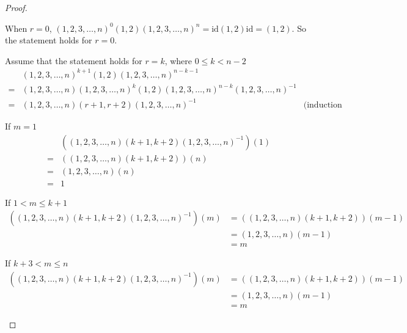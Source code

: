 \begin{proof}
\begin{enumerate}[label={\textbf{Case \arabic*.}},itemindent=1cm]
              When $r = 0$, ${(1,2,3,\ldots,n)}^{0}(1,2){(1,2,3,\ldots,n)}^{n} = \text{id}(1,2)\text{id} = (1,2)$. So the statement holds for $r = 0$.

              Assume that the statement holds for $r = k$, where $0\leq k < n - 2$
              \begin{align*}
                    & {(1,2,3,\ldots,n)}^{k+1}(1,2){(1,2,3,\ldots,n)}^{n-k-1}                                                                    \\
                  = & (1,2,3,\ldots,n){(1,2,3,\ldots,n)}^{k}(1,2){(1,2,3,\ldots,n)}^{n-k}{(1,2,3,\ldots,n)}^{-1}                                 \\
                  = & (1,2,3,\ldots,n)(r+1,r+2){(1,2,3,\ldots,n)}^{-1}                                           & \text{(induction hypothesis)}
              \end{align*}

              If $m = 1$
              \begin{align*}
                    & ((1,2,3,\ldots,n)(k+1,k+2){(1,2,3,\ldots,n)}^{-1})(1) \\
                  = & ((1,2,3,\ldots,n)(k+1,k+2))(n)                        \\
                  = & (1,2,3,\ldots,n)(n)                                   \\
                  = & 1
              \end{align*}

              If $1 < m \leq k+1$
              \begin{align*}
                  ((1,2,3,\ldots,n)(k+1,k+2){(1,2,3,\ldots,n)}^{-1})(m) & = ((1,2,3,\ldots,n)(k+1,k+2))(m-1) \\
                                                                        & = (1,2,3,\ldots,n)(m-1)            \\
                                                                        & = m
              \end{align*}

              If $k+3 < m\leq n$
              \begin{align*}
                  ((1,2,3,\ldots,n)(k+1,k+2){(1,2,3,\ldots,n)}^{-1})(m) & = ((1,2,3,\ldots,n)(k+1,k+2))(m-1) \\
                                                                        & = (1,2,3,\ldots,n)(m-1)            \\
                                                                        & = m
              \end{align*}


\end{enumerate}
\end{proof}
